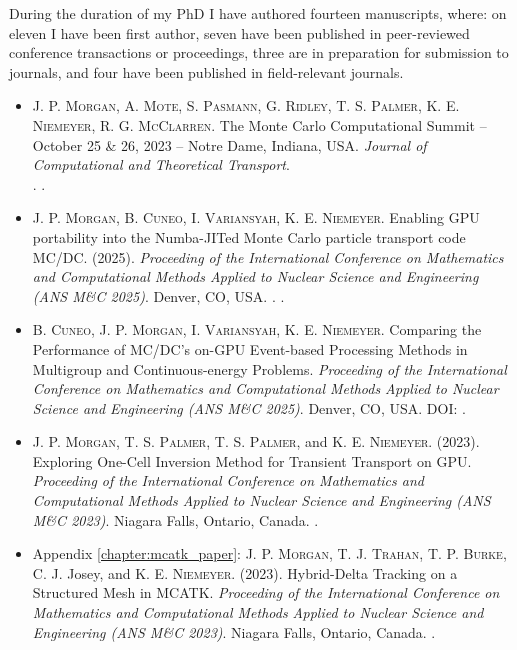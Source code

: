 During the duration of my PhD I have authored fourteen manuscripts, where: on eleven I have been first author, seven have been published in peer-reviewed conference transactions or proceedings, three are in preparation for submission to journals, and four have been published in field-relevant journals.
\begin{itemize}
    \item \textsc{J. P. Morgan}, \textsc{A. Mote}, \textsc{S. Pasmann}, \textsc{ G. Ridley}, \textsc{T. S. Palmer}, \textsc{K. E. Niemeyer}, \textsc{R. G. McClarren}. The Monte Carlo Computational Summit -- October 25 \& 26, 2023 -- Notre Dame, Indiana, USA. \emph{Journal of Computational and Theoretical Transport}.\\
    .
    . 

    \item \textsc{J. P. Morgan}, \textsc{B. Cuneo}, \textsc{I. Variansyah}, \textsc{K. E. Niemeyer}. Enabling GPU portability into the Numba-JITed Monte Carlo particle transport code MC/DC. (2025). \emph{Proceeding of the International Conference on Mathematics and Computational Methods Applied to Nuclear Science and Engineering (ANS M\&C 2025)}. Denver, CO, USA. . .

    \item \textsc{B. Cuneo}, \textsc{J. P. Morgan}, \textsc{I. Variansyah}, \textsc{K. E. Niemeyer}. Comparing the Performance of MC/DC's on-GPU Event-based Processing Methods in Multigroup and Continuous-energy Problems. \emph{Proceeding of the International Conference on Mathematics and Computational Methods Applied to Nuclear Science and Engineering (ANS M\&C 2025)}. Denver, CO, USA. DOI: .

    \item \textsc{J. P. Morgan}, \textsc{T. S. Palmer}, \textsc{T. S. Palmer}, and \textsc{K. E. Niemeyer}. (2023). Exploring One-Cell Inversion Method for Transient Transport on GPU. \emph{Proceeding of the International Conference on Mathematics and Computational Methods Applied to Nuclear Science and Engineering (ANS M\&C 2023)}. Niagara Falls, Ontario, Canada. .

    \item Appendix \ref{chapter:mcatk_paper}: \textsc{J. P. Morgan}, \textsc{T. J. Trahan}, \textsc{T. P. Burke}, {C. J. Josey}, and \textsc{K. E. Niemeyer}. (2023). Hybrid-Delta Tracking on a Structured Mesh in MCATK. \emph{Proceeding of the International Conference on Mathematics and Computational Methods Applied to Nuclear Science and Engineering (ANS M\&C 2023)}. Niagara Falls, Ontario, Canada. .


\end{itemize}
